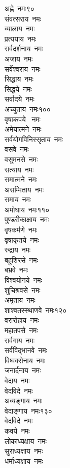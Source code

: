 \begin{multicols}{\maxColumns}
\begin{flushleft}
अह्ने~नमः\hfill ९०\\
संवत्सराय~नमः\\
व्यालाय~नमः\\
प्रत्ययाय~नमः\\
सर्वदर्शनाय~नमः\\
अजाय~नमः\\
सर्वेश्वराय~नमः\\
सिद्धाय~नमः\\
सिद्धये~नमः\\
सर्वादये~नमः\\
अच्युताय~नमः\hfill १००\\
वृषाकपये ~नमः\\
अमेयात्मने~नमः\\
सर्वयोगविनिस्सृताय~नमः\\
वसवे~नमः\\
वसुमनसे~नमः\\
सत्याय~नमः\\
समात्मने~नमः\\
असम्मिताय~नमः\\
समाय~नमः\\
अमोघाय~नमः\hfill ११०\\
पुण्डरीकाक्षाय~नमः\\
वृषकर्मणे~नमः\\
वृषाकृतये~नमः\\
रुद्राय~नमः\\
बहुशिरसे~नमः\\
बभ्रवे~नमः\\
विश्वयोनये~नमः\\
शुचिश्रवसे~नमः\\
अमृताय~नमः\\
शाश्वतस्स्थाणवे~नमः\hfill १२०\\
वरारोहाय~नमः\\
महातपसे~नमः\\
सर्वगाय~नमः\\
सर्वविद्भानवे~नमः\\
विष्वक्सेनाय~नमः\\
जनार्दनाय~नमः\\
वेदाय~नमः\\
वेदविदे~नमः\\
अव्यङ्गाय~नमः\\
वेदाङ्गाय~नमः\hfill १३०\\
वेदविदे~नमः\\
कवये~नमः\\
लोकाध्यक्षाय~नमः\\
सुराध्यक्षाय~नमः\\
धर्माध्यक्षाय~नमः\\

\end{flushleft}
\end{multicols}
